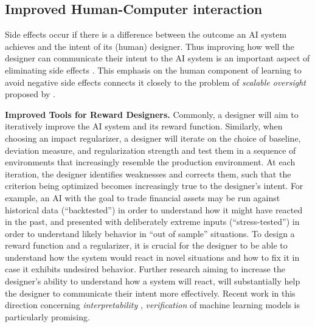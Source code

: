 \documentclass[letterpaper]{article} %
\newcommand{\statement}[1]{\textbf{#1}}
\begin{document}
\subsection{Improved Human-Computer interaction} \label{sec:human_computer}
Side effects occur if there is a difference between the outcome an AI system achieves and the intent of its (human) designer. Thus improving how well the designer can communicate their intent to the AI system is an important aspect of eliminating side effects \cite{leike2018scalable}. This emphasis on the human component of learning to avoid negative side effects connects it closely to the problem of \emph{scalable oversight} proposed by \citet{amodei2016concrete}.

\statement{Improved Tools for Reward Designers.} Commonly, a designer will aim to iteratively improve the AI system and its reward function. Similarly, when choosing an impact regularizer, a designer will iterate on the choice of baseline, deviation measure, and regularization strength and test them in a sequence of environments that increasingly resemble the production environment. At each iteration, the designer identifies weaknesses and corrects them, such that the criterion being optimized becomes increasingly true to the designer's intent. For example, an AI with the goal to trade financial assets may be run against historical data (``backtested'') in order to understand how it might have reacted in the past, and presented with deliberately extreme inputs (``stress-tested'') in order to understand likely behavior in ``out of sample'' situations. To design a reward function and a regularizer, it is crucial for the designer to be able to understand how the system would react in novel situations and how to fix it in case it exhibits undesired behavior. Further research aiming to increase the designer's ability to understand how a system will react, will substantially help the designer to communicate their intent more effectively. Recent work in this direction concerning \emph{interpretability} \citep{gilpin2018explaining}, \emph{verification} \citep[e.g.][]{huang2017safety} of machine learning models is particularly promising.
\end{document}
